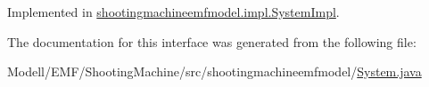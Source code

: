 Implemented in \hyperlink{classshootingmachineemfmodel_1_1impl_1_1_system_impl_aeb13534d36d6f772d317c7c2c8b47241}{shootingmachineemfmodel.\-impl.\-System\-Impl}.



The documentation for this interface was generated from the following file\-:\begin{DoxyCompactItemize}
\item 
Modell/\-E\-M\-F/\-Shooting\-Machine/src/shootingmachineemfmodel/\hyperlink{_system_8java}{System.\-java}\end{DoxyCompactItemize}
